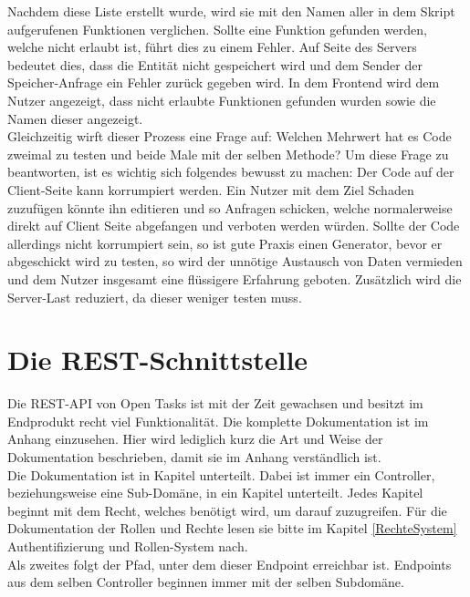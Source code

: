 Nachdem diese Liste erstellt wurde, wird sie mit den Namen aller in dem Skript aufgerufenen Funktionen verglichen. Sollte eine Funktion gefunden werden, welche nicht erlaubt ist, führt dies zu einem Fehler. Auf Seite des Servers bedeutet dies, dass die Entität nicht gespeichert wird und dem Sender der Speicher-Anfrage ein Fehler zurück gegeben wird. In dem Frontend wird dem Nutzer angezeigt, dass nicht erlaubte Funktionen gefunden wurden sowie die Namen dieser angezeigt. \\

Gleichzeitig wirft dieser Prozess eine Frage auf: Welchen Mehrwert hat es Code zweimal zu testen und beide Male mit der selben Methode? Um diese Frage zu beantworten, ist es wichtig sich folgendes bewusst zu machen: Der Code auf der Client-Seite kann korrumpiert werden. Ein Nutzer mit dem Ziel Schaden zuzufügen könnte ihn editieren und so Anfragen schicken, welche normalerweise direkt auf Client Seite abgefangen und verboten werden würden. Sollte der Code allerdings nicht korrumpiert sein, so ist gute Praxis einen Generator, bevor er abgeschickt wird zu testen, so wird der unnötige Austausch von Daten vermieden und dem Nutzer insgesamt eine flüssigere Erfahrung geboten. Zusätzlich wird die Server-Last reduziert, da dieser weniger testen muss.


\section{Die REST-Schnittstelle}

Die REST-API von Open Tasks ist mit der Zeit gewachsen und besitzt im Endprodukt recht viel Funktionalität. Die komplette Dokumentation ist im Anhang einzusehen. Hier wird lediglich kurz die Art und Weise der Dokumentation beschrieben, damit sie im Anhang verständlich ist. \\

Die Dokumentation ist in Kapitel unterteilt. Dabei ist immer ein Controller, beziehungsweise eine Sub-Domäne, in ein Kapitel unterteilt. Jedes Kapitel beginnt mit dem Recht, welches benötigt wird, um darauf zuzugreifen. Für die Dokumentation der Rollen und Rechte lesen sie bitte im Kapitel \ref{RechteSystem} Authentifizierung und Rollen-System nach. \\

Als zweites folgt der Pfad, unter dem dieser Endpoint erreichbar ist. Endpoints aus dem selben Controller beginnen immer mit der selben Subdomäne. \\

